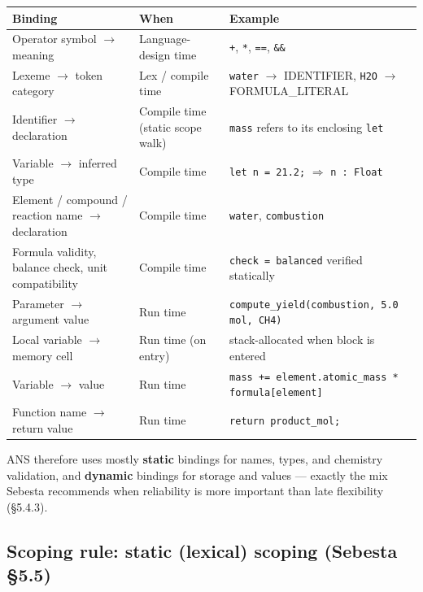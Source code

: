 \documentclass[11pt,a4paper]{article}
\newcommand{\thd}[1]{\textbf{\color{white}#1}}
\newcommand{\code}[1]{\texttt{#1}}
\begin{document}
{\footnotesize
{}
\begin{tabularx}{\linewidth}{@{}>{\RaggedRight\arraybackslash}p{5.4cm}
                               >{\RaggedRight\arraybackslash}p{4.0cm}
                               Y@{}}
\toprule
{}\thd{Binding} & \thd{When} & \thd{Example}\\
\midrule
Operator symbol $\to$ meaning
  & Language-design time
  & \code{+}, \code{*}, \code{==}, \code{\&\&}\\
Lexeme $\to$ token category
  & Lex / compile time
  & \code{water} $\to$ IDENTIFIER, \code{H2O} $\to$ FORMULA\_LITERAL\\
Identifier $\to$ declaration
  & Compile time (static scope walk)
  & \code{mass} refers to its enclosing \code{let}\\
Variable $\to$ inferred type
  & Compile time
  & \code{let n = 21.2;} $\Rightarrow$ \code{n : Float}\\
Element / compound / reaction name $\to$ declaration
  & Compile time
  & \code{water}, \code{combustion}\\
Formula validity, balance check, unit compatibility
  & Compile time
  & \code{check = balanced} verified statically\\
Parameter $\to$ argument value
  & Run time
  & \code{compute\_yield(combustion, 5.0 mol, CH4)}\\
Local variable $\to$ memory cell
  & Run time (on entry)
  & stack-allocated when block is entered\\
Variable $\to$ value
  & Run time
  & \code{mass += element.atomic\_mass * formula[element]}\\
Function name $\to$ return value
  & Run time
  & \code{return product\_mol;}\\
\bottomrule
\end{tabularx}}
\par\vspace{2pt}

ANS therefore uses mostly \textbf{static} bindings for names, types, and
chemistry validation, and \textbf{dynamic} bindings for storage and values
--- exactly the mix Sebesta recommends when reliability is more important
than late flexibility (\S5.4.3).

\subsection{Scoping rule: static (lexical) scoping (Sebesta \S5.5)}
\end{document}
